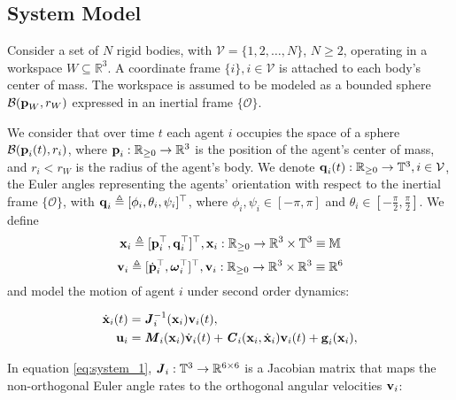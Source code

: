 \subsection{System Model}

Consider a set of $N$ rigid bodies, with $\mathcal{V} = \{ 1,2, \ldots, N\}$,
$N  \geq 2$, operating in a workspace $W\subseteq \mathbb{R}^3$.
A coordinate frame $\{i\}, i\in\mathcal{V}$ is attached to each body's
center of mass. The workspace is assumed to be modeled as a
bounded sphere $\mathcal{B}(\bm{\mathbf{p}}_W,r_W)$ expressed in an inertial frame
$\{\mathcal{O}\}$.

We consider that over time $t$ each agent $i$ occupies the space of a sphere
$\mathcal{B}(\bm{\mathbf{p}}_i(t), r_i)$, where $\bm{\mathbf{p}}_i : \mathbb{R}_{\geq 0} \to \mathbb{R}^3$
is the position of the agent's center of mass, and $r_i < r_W$ is the radius of the
agent's body. We denote $\bm{\mathbf{q}}_i(t):\mathbb{R}_{\geq 0} \to \mathbb{T}^3, i\in\mathcal{V}$,
the Euler angles representing the agents' orientation with respect to the
inertial frame $\{\mathcal{O}\}$,
with $\bm{\mathbf{q}}_i \triangleq [\phi_i,\theta_i,\psi_i]^{\top}$, where
$\phi_i, \psi_i \in [-\pi, \pi]$ and
$\theta_i \in [-\frac{\pi}{2}, \frac{\pi}{2}]$. We define
$$\bm{\mathbf{x}}_i \triangleq [\bm{\mathbf{p}}^{\top}_i,\bm{\mathbf{q}}^{\top}_i]^{\top},
\bm{\mathbf{x}}_i:\mathbb{R}_{\geq 0} \to \mathbb{R}^3\times \mathbb{T}^3 \equiv \mathbb{M}$$
$$\bm{\mathbf{v}}_i \triangleq [\dot{\bm{\mathbf{p}}}^{\top}_i, \bm{\mathbf{\omega}}^{\top}_i]^{\top},
\bm{\mathbf{v}}_i : \mathbb{R}_{\geq 0} \to \mathbb{R}^3\times \mathbb{R}^3 \equiv \mathbb{R}^6$$
and model the motion of agent $i$ under second order dynamics:

\begin{subequations}
	\begin{align}
    \dot{\bm{\mathbf{x}}}_i(t) &= \bm{\mathit{J}}_i^{-1}(\bm{\mathbf{x}}_i) \bm{\mathbf{v}}_i(t), \label{eq:system_1} \\
    \bm{\mathbf{u}}_i &= \bm{\mathit{M}}_i(\bm{\mathbf{x}}_i) \dot{\bm{\mathbf{v}}}_i(t) + \bm{\mathit{C}}_i(\bm{\mathbf{x}}_i,\dot{\bm{\mathbf{x}}}_i) \bm{\mathbf{v}}_i(t)+\bm{\mathbf{g}}_i(\bm{\mathbf{x}}_i), \label{eq:system_2}
	\end{align}
  \label{eq:system}
\end{subequations}

In equation \eqref{eq:system_1}, $\bm{\mathit{J}}_i:\mathbb{T}^3 \to \mathbb{R}^{6\times6}$ is
a Jacobian matrix that maps the non-orthogonal Euler angle rates to the
orthogonal angular velocities $\bm{\mathbf{v}}_i$:

